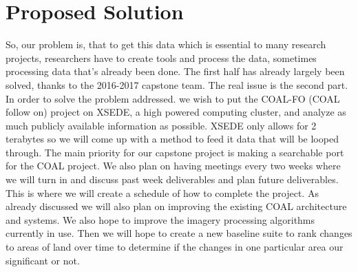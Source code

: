 \documentclass{article}
\begin{document}
\section*{Proposed Solution}
So, our problem is, that to get this data which is essential to many research
projects, researchers have to create tools and process the data, sometimes
processing data that’s already been done. The first half has already largely
been solved, thanks to the 2016-2017 capstone team. The real issue is the
second part. In order to solve the problem addressed. we wish to put the
COAL-FO (COAL follow on) project on XSEDE, a high powered computing cluster,
and analyze as much publicly available information as possible. XSEDE only
allows for 2 terabytes so we will come up with a method to feed it data that
will be looped through. The main priority for our capstone project is making a
searchable port for the COAL project. We also plan on having meetings every two
weeks where we will turn in and discuss past week deliverables and plan future
deliverables. This is where we will create a schedule of how to complete the
project. As already discussed we will also plan on improving the existing COAL
architecture and systems. We also hope to improve the imagery processing
algorithms currently in use. Then we will hope to create a new baseline suite
to rank changes to areas of land over time to determine if the changes in one
particular area our significant or not.

\end{document}
